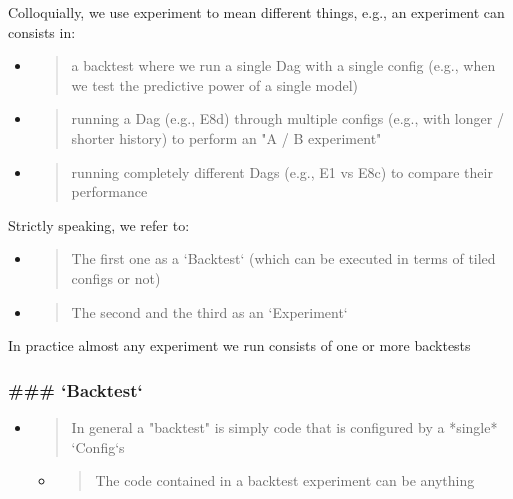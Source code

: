 \documentclass[11pt, reqno]{amsart}
\begin{document}
Colloquially, we use experiment to mean different things, e.g., an
experiment can consists in:

\begin{itemize}
\item
  \begin{quote}
  a backtest where we run a single Dag with a single config (e.g., when
  we test the predictive power of a single model)
  \end{quote}
\end{itemize}

\begin{itemize}
\item
  \begin{quote}
  running a Dag (e.g., E8d) through multiple configs (e.g., with longer
  / shorter history) to perform an "A / B experiment"
  \end{quote}
\item
  \begin{quote}
  running completely different Dags (e.g., E1 vs E8c) to compare their
  performance
  \end{quote}
\end{itemize}

Strictly speaking, we refer to:

\begin{itemize}
\item
  \begin{quote}
  The first one as a `Backtest` (which can be executed in terms of tiled
  configs or not)
  \end{quote}
\item
  \begin{quote}
  The second and the third as an `Experiment`
  \end{quote}
\end{itemize}

In practice almost any experiment we run consists of one or more
backtests

\hypertarget{backtest}{%
\subsubsection{\texorpdfstring{\textbf{\#\#\#
`Backtest`}}{\#\#\# `Backtest`}}\label{backtest}}

\begin{itemize}
\item
  \begin{quote}
  In general a "backtest" is simply code that is configured by a
  *single* `Config`s
  \end{quote}

  \begin{itemize}
  \item
    \begin{quote}
    The code contained in a backtest experiment can be anything
    \end{quote}
  \end{itemize}
\end{itemize}
\end{document}
